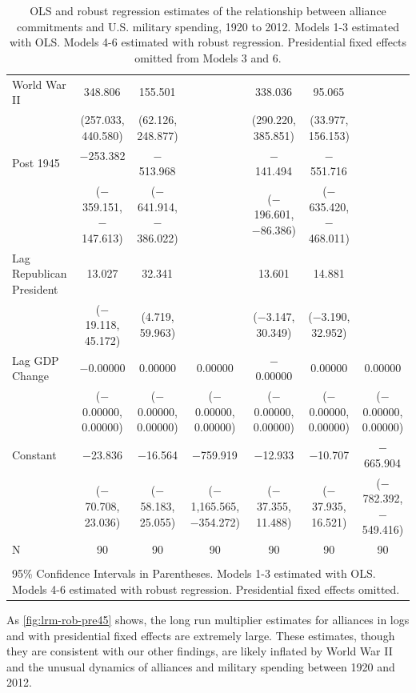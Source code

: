 \documentclass[12pt]{article}
\begin{document}
\begin{table}
\begin{adjustbox}{width= \textwidth}
\begin{tabular}{@{\extracolsep{5pt}}lcccccc}
  World War II & 348.806$^{}$ & 155.501$^{}$ &  & 338.036$^{}$ & 95.065$^{}$ &  \\ 
  & (257.033, 440.580) & (62.126, 248.877) &  & (290.220, 385.851) & (33.977, 156.153) &  \\ 
  Post 1945 & $-$253.382$^{}$ & $-$513.968$^{}$ &  & $-$141.494$^{}$ & $-$551.716$^{}$ &  \\ 
  & ($-$359.151, $-$147.613) & ($-$641.914, $-$386.022) &  & ($-$196.601, $-$86.386) & ($-$635.420, $-$468.011) &  \\ 
  Lag Republican President & 13.027 & 32.341$^{}$ &  & 13.601 & 14.881 &  \\ 
  & ($-$19.118, 45.172) & (4.719, 59.963) &  & ($-$3.147, 30.349) & ($-$3.190, 32.952) &  \\ 
  Lag GDP Change & $-$0.00000 & 0.00000 & 0.00000 & $-$0.00000 & 0.00000 & 0.00000 \\ 
  & ($-$0.00000, 0.00000) & ($-$0.00000, 0.00000) & ($-$0.00000, 0.00000) & ($-$0.00000, 0.00000) & ($-$0.00000, 0.00000) & ($-$0.00000, 0.00000) \\  
  Constant & $-$23.836 & $-$16.564 & $-$759.919$^{}$ & $-$12.933 & $-$10.707 & $-$665.904$^{}$ \\ 
  & ($-$70.708, 23.036) & ($-$58.183, 25.055) & ($-$1,165.565, $-$354.272) & ($-$37.355, 11.488) & ($-$37.935, 16.521) & ($-$782.392, $-$549.416) \\ 
 N & 90 & 90 & 90 & 90 & 90 & 90 \\ 
\hline \\[-1.8ex] 
\multicolumn{7}{l}{95\% Confidence Intervals in Parentheses. Models 1-3 estimated with OLS.
          Models 4-6 estimated with robust regression. Presidential fixed effects omitted.} \\ 
\end{tabular} 
\end{adjustbox}
  \caption{OLS and robust regression estimates of the relationship between alliance commitments and U.S. military spending, 1920 to 2012. Models 1-3 estimated with OLS. Models 4-6 estimated with robust regression. Presidential fixed effects omitted from Models 3 and 6.} 
  \label{tab:adl-coefs-pre45} 
\end{table} 


As \autoref{fig:lrm-rob-pre45} shows, the long run multiplier estimates for alliances in logs and with presidential fixed effects are extremely large.
These estimates, though they are consistent with our other findings, are likely inflated by World War II and the unusual dynamics of alliances and military spending between 1920 and 2012. 
\end{document}
